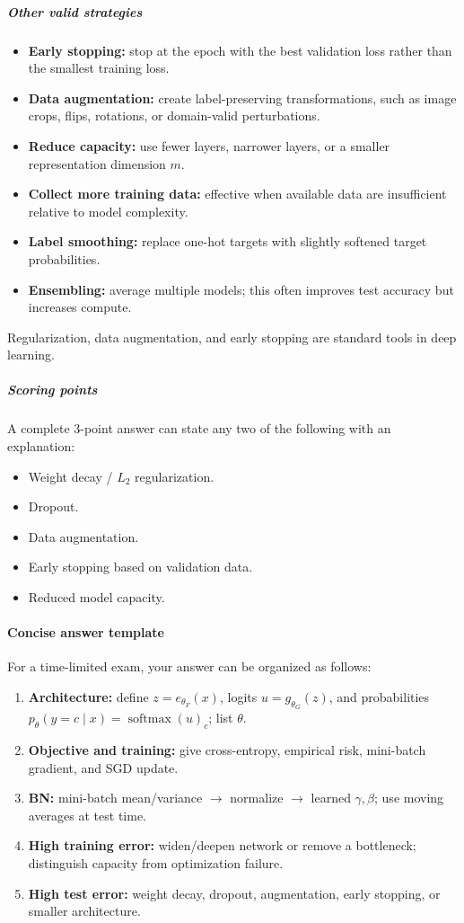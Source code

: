 \documentclass[11pt,a4paper]{article}
\DeclareMathOperator{\softmax}{softmax}
\theoremstyle{definition}
\begin{document}
\subparagraph{Other valid strategies}
\begin{itemize}
    \item \textbf{Early stopping:} stop at the epoch with the best validation loss rather than the smallest training loss.
    \item \textbf{Data augmentation:} create label-preserving transformations, such as image crops, flips, rotations, or domain-valid perturbations.
    \item \textbf{Reduce capacity:} use fewer layers, narrower layers, or a smaller representation dimension $m$.
    \item \textbf{Collect more training data:} effective when available data are insufficient relative to model complexity.
    \item \textbf{Label smoothing:} replace one-hot targets with slightly softened target probabilities.
    \item \textbf{Ensembling:} average multiple models; this often improves test accuracy but increases compute.
\end{itemize}

Regularization, data augmentation, and early stopping are standard tools in deep learning.

\subparagraph{Scoring points}
A complete 3-point answer can state any two of the following with an explanation:
\begin{itemize}
    \item Weight decay / $L_2$ regularization.
    \item Dropout.
    \item Data augmentation.
    \item Early stopping based on validation data.
    \item Reduced model capacity.
\end{itemize}


\paragraph{Concise answer template}

For a time-limited exam, your answer can be organized as follows:
\begin{enumerate}
    \item \textbf{Architecture:} define $z=e_{\theta_F}(x)$, logits $u=g_{\theta_G}(z)$, and probabilities $p_\theta(y=c\mid x)=\softmax(u)_c$; list $\theta$.
    \item \textbf{Objective and training:} give cross-entropy, empirical risk, mini-batch gradient, and SGD update.
    \item \textbf{BN:} mini-batch mean/variance $\to$ normalize $\to$ learned $\gamma,\beta$; use moving averages at test time.
    \item \textbf{High training error:} widen/deepen network or remove a bottleneck; distinguish capacity from optimization failure.
    \item \textbf{High test error:} weight decay, dropout, augmentation, early stopping, or smaller architecture.
\end{enumerate}
\end{document}

